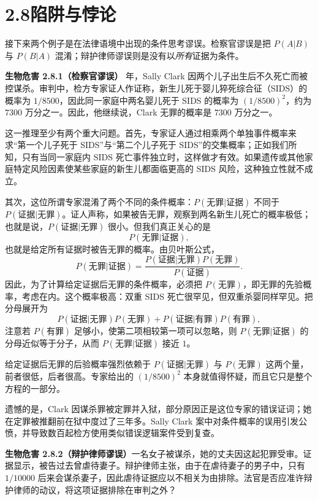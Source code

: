 \documentclass[UTF8,12pt,a4paper,fontset=fandol]{ctexart}
\begin{document}
\section*{2.8\quad 陷阱与悖论}

接下来两个例子是在法律语境中出现的条件思考谬误。检察官谬误是把 $P(A|B)$ 与 $P(B|A)$ 混淆；辩护律师谬误则是没有以\textit{所有}证据为条件。

\noindent\textbf{生物危害 2.8.1（检察官谬误）} 年，Sally Clark 因两个儿子出生后不久死亡而被控谋杀。审判中，检方专家证人作证称，新生儿死于婴儿猝死综合征（SIDS）的概率为 $1/8500$，因此同一家庭中两名婴儿死于 SIDS 的概率为 $(1/8500)^2$，约为 $7300$ 万分之一。因此，他继续说，Clark 无罪的概率是 $7300$ 万分之一。

这一推理至少有两个重大问题。首先，专家证人通过相乘两个单独事件概率来求“第一个儿子死于 SIDS”与“第二个儿子死于 SIDS”的交集概率；正如我们所知，只有当同一家庭内 SIDS 死亡事件独立时，这样做才有效。如果遗传或其他家庭特定风险因素使某些家庭的新生儿都面临更高的 SIDS 风险，这种独立性就不成立。

其次，这位所谓专家混淆了两个不同的条件概率：$P(\text{无罪}|\text{证据})$ 不同于 $P(\text{证据}|\text{无罪})$。证人声称，如果被告无罪，观察到两名新生儿死亡的概率极低；也就是说，$P(\text{证据}|\text{无罪})$ 很小。但我们真正关心的是
\[
  P(\text{无罪}|\text{证据}),
\]
也就是给定所有证据时被告无罪的概率。由贝叶斯公式，
\[
  P(\text{无罪}|\text{证据})
  =
  \frac{
    P(\text{证据}|\text{无罪})P(\text{无罪})
  }{
    P(\text{证据})
  }.
\]
因此，为了计算给定证据后无罪的条件概率，必须把 $P(\text{无罪})$，即无罪的先验概率，考虑在内。这个概率极高：双重 SIDS 死亡很罕见，但双重杀婴同样罕见。把分母展开为
\[
  P(\text{证据}|\text{无罪})P(\text{无罪})
  +
  P(\text{证据}|\text{有罪})P(\text{有罪}),
\]
注意若 $P(\text{有罪})$ 足够小，使第二项相较第一项可以忽略，则 $P(\text{无罪}|\text{证据})$ 的分母近似等于分子，从而 $P(\text{无罪}|\text{证据})$ 接近 $1$。

给定证据后无罪的后验概率强烈依赖于 $P(\text{证据}|\text{无罪})$ 与 $P(\text{无罪})$ 这两个量，前者很低，后者很高。专家给出的 $(1/8500)^2$ 本身就值得怀疑，而且它只是整个方程的一部分。

遗憾的是，Clark 因谋杀罪被定罪并入狱，部分原因正是这位专家的错误证词；她在定罪被推翻前在狱中度过了三年多。Sally Clark 案中对条件概率的误用引发公愤，并导致数百起检方使用类似错误逻辑案件受到复查。

\noindent\textbf{生物危害 2.8.2（辩护律师谬误）}\quad 一名女子被谋杀，她的丈夫因这起犯罪受审。证据显示，被告过去曾虐待妻子。辩护律师主张，由于在虐待妻子的男子中，只有 $1/10000$ 后来会谋杀妻子，因此虐待证据应以不相关为由排除。法官是否应准许辩护律师的动议，将这项证据排除在审判之外？
\end{document}
